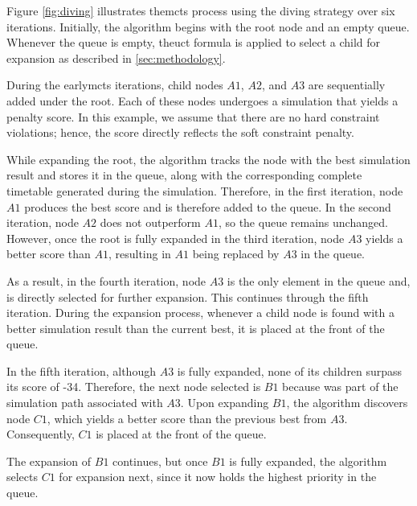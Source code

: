 Figure \ref{fig:diving} illustrates the\ac{mcts} process using the diving strategy over six iterations. Initially, the algorithm begins with the root node and an empty queue. Whenever the queue is empty, the\ac{uct} formula is applied to select a child for expansion as described in \ref{sec:methodology}.

During the early\ac{mcts} iterations, child nodes \(A1\), \(A2\), and \(A3\) are sequentially added under the root. Each of these nodes undergoes a simulation that yields a penalty score. In this example, we assume that there are no hard constraint violations; hence, the score directly reflects the soft constraint penalty. 

While expanding the root, the algorithm tracks the node with the best simulation result and stores it in the queue, along with the corresponding complete timetable generated during the simulation. Therefore, in the first iteration, node \(A1\) produces the best score and is therefore added to the queue. In the second iteration, node \(A2\) does not outperform \(A1\), so the queue remains unchanged. However, once the root is fully expanded in the third iteration, node \(A3\) yields a better score than \(A1\), resulting in \(A1\) being replaced by \(A3\) in the queue. 

As a result, in the fourth iteration, node \(A3\) is the only element in the queue and, is directly selected for further expansion. This continues through the fifth iteration. During the expansion process, whenever a child node is found with a better simulation result than the current best, it is placed at the front of the queue. 

In the fifth iteration, although \(A3\) is fully expanded, none of its children surpass its score of -34. Therefore, the next node selected is \(B1\) because was part of the simulation path associated with \(A3\). Upon expanding \(B1\), the algorithm discovers node \(C1\), which yields a better score than the previous best from \(A3\). Consequently, \(C1\) is placed at the front of the queue.  

The expansion of \(B1\) continues, but once \(B1\) is fully expanded, the algorithm selects \(C1\) for expansion next, since it now holds the highest priority in the queue.

